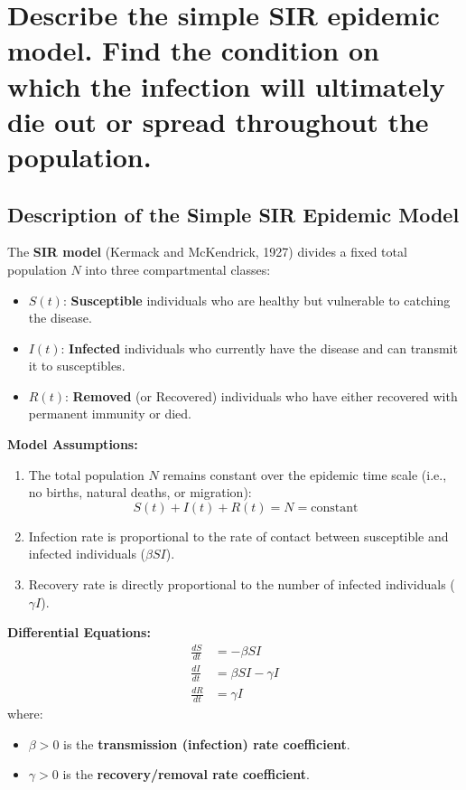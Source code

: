 \section{Describe the simple SIR epidemic model. Find the condition on which the infection will ultimately die out or spread throughout the population.}
\subsection*{Description of the Simple SIR Epidemic Model}

The \textbf{SIR model} (Kermack and McKendrick, 1927) divides a fixed total population $N$ into three compartmental classes:

\begin{itemize}
    \item $S(t)$: \textbf{Susceptible} individuals who are healthy but vulnerable to catching the disease.
    \item $I(t)$: \textbf{Infected} individuals who currently have the disease and can transmit it to susceptibles.
    \item $R(t)$: \textbf{Removed} (or Recovered) individuals who have either recovered with permanent immunity or died.
\end{itemize}
\noindent\textbf{Model Assumptions:}
\begin{enumerate}
    \item The total population $N$ remains constant over the epidemic time scale (i.e., no births, natural deaths, or migration):
    \[
        S(t) + I(t) + R(t) = N = \text{constant}
    \]
    \item Infection rate is proportional to the rate of contact between susceptible and infected individuals ($\beta S I$).
    \item Recovery rate is directly proportional to the number of infected individuals ($\gamma I$).
\end{enumerate}
\noindent\textbf{Differential Equations:}
\begin{align}
    \frac{dS}{dt} &= -\beta S I \tag{1} \\
    \frac{dI}{dt} &= \beta S I - \gamma I \tag{2} \\
    \frac{dR}{dt} &= \gamma I \tag{3}
\end{align}
\noindent where:
\begin{itemize}
    \item $\beta > 0$ is the \textbf{transmission (infection) rate coefficient}.
    \item $\gamma > 0$ is the \textbf{recovery/removal rate coefficient}.
\end{itemize}
